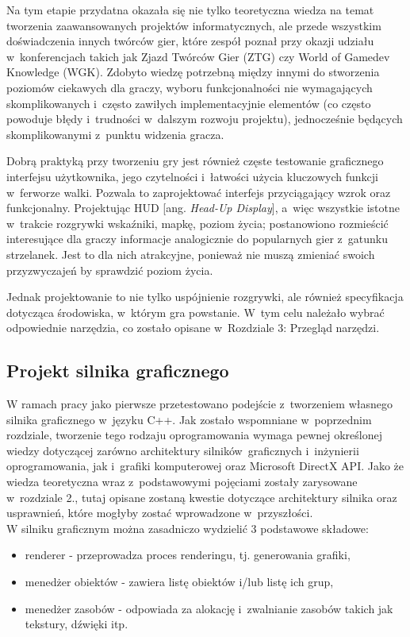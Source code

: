 Na tym etapie przydatna okazała się nie tylko teoretyczna wiedza na temat tworzenia zaawansowanych projektów informatycznych, ale przede wszystkim doświadczenia innych twórców gier, które zespół poznał przy okazji udziału w~konferencjach takich jak Zjazd Twórców Gier (ZTG) czy World of Gamedev Knowledge (WGK). Zdobyto wiedzę potrzebną między innymi do stworzenia poziomów ciekawych dla graczy, wyboru funkcjonalności nie wymagających skomplikowanych i~często zawiłych implementacyjnie elementów (co często powoduje błędy i~trudności w~dalszym rozwoju projektu), jednocześnie będących skomplikowanymi z~punktu widzenia gracza. 

Dobrą praktyką przy tworzeniu gry jest również częste testowanie graficznego interfejsu użytkownika, jego czytelności i~łatwości użycia kluczowych funkcji w~ferworze walki. Pozwala to zaprojektować interfejs przyciągający wzrok oraz funkcjonalny. Projektując HUD [ang. \emph{Head-Up Display}], a~więc wszystkie istotne w~trakcie rozgrywki wskaźniki, mapkę, poziom życia; postanowiono rozmieścić interesujące dla graczy informacje analogicznie do popularnych gier z~gatunku strzelanek. Jest to dla nich atrakcyjne, ponieważ nie muszą zmieniać swoich przyzwyczajeń by sprawdzić poziom życia. 

Jednak projektowanie to nie tylko uspójnienie rozgrywki, ale również specyfikacja dotycząca środowiska, w~którym gra powstanie. W~tym celu należało wybrać odpowiednie narzędzia, co zostało opisane w~Rozdziale 3: Przegląd narzędzi. 

\subsection{Projekt silnika graficznego}

W ramach pracy jako pierwsze przetestowano podejście z~tworzeniem własnego silnika graficznego w~języku C++. Jak zostało wspomniane w~poprzednim rozdziale, tworzenie tego rodzaju oprogramowania wymaga pewnej określonej wiedzy dotyczącej zarówno architektury silników~graficznych i~inżynierii oprogramowania, jak i~grafiki komputerowej oraz Microsoft DirectX API. Jako że wiedza teoretyczna wraz z~podstawowymi pojęciami zostały zarysowane w~rozdziale 2., tutaj opisane zostaną kwestie dotyczące architektury silnika oraz usprawnień, które mogłyby zostać wprowadzone w~przyszłości.\\

W silniku graficznym można zasadniczo wydzielić 3 podstawowe składowe:
\begin{itemize}
\item renderer - przeprowadza proces renderingu, tj. generowania grafiki,
\item menedżer obiektów - zawiera listę obiektów i/lub listę ich grup,
\item menedżer zasobów - odpowiada za alokację i~zwalnianie zasobów takich jak tekstury, dźwięki itp.
\end{itemize}

